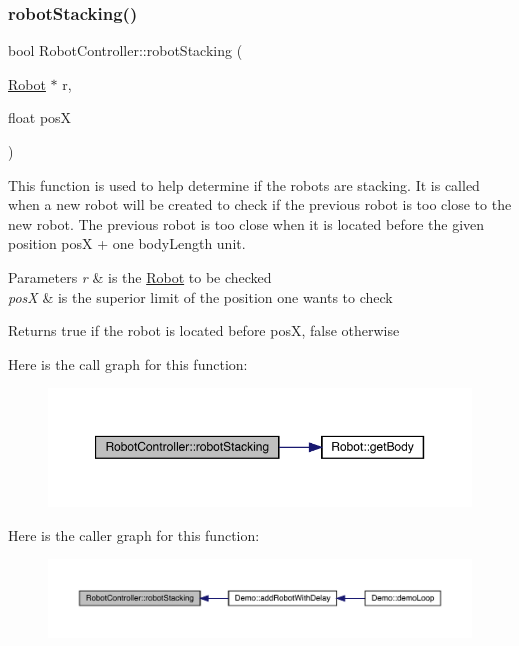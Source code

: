 \subsubsection{\texorpdfstring{robot\+Stacking()}{robotStacking()}}
{\footnotesize\ttfamily bool Robot\+Controller\+::robot\+Stacking (\begin{DoxyParamCaption}\item[{\mbox{\hyperlink{class_robot}{Robot}} $\ast$}]{r,  }\item[{float}]{posX }\end{DoxyParamCaption})}

This function is used to help determine if the robots are stacking. It is called when a new robot will be created to check if the previous robot is too close to the new robot. The previous robot is too close when it is located before the given position posX + one body\+Length unit. 
\begin{DoxyParams}{Parameters}
{\em r} & is the \mbox{\hyperlink{class_robot}{Robot}} to be checked \\
\hline
{\em posX} & is the superior limit of the position one wants to check \\
\hline
\end{DoxyParams}
\begin{DoxyReturn}{Returns}
true if the robot is located before posX, false otherwise 
\end{DoxyReturn}
Here is the call graph for this function\+:\nopagebreak
\begin{figure}[H]
\begin{center}
\leavevmode
\includegraphics[width=350pt]{class_robot_controller_a83d343eb8958d365624d06ac1b0b1b3d_cgraph}
\end{center}
\end{figure}
Here is the caller graph for this function\+:\nopagebreak
\begin{figure}[H]
\begin{center}
\leavevmode
\includegraphics[width=350pt]{class_robot_controller_a83d343eb8958d365624d06ac1b0b1b3d_icgraph}
\end{center}
\end{figure}
\mbox{\label{class_robot_controller_a19191b156161bd7a3978659329ceaad2}} 
